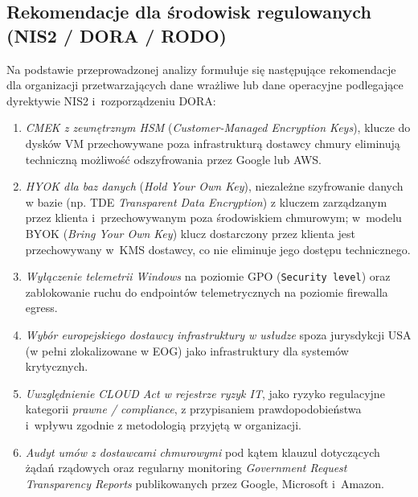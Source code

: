 \subsection{Rekomendacje dla środowisk regulowanych (NIS2 / DORA / RODO)}

Na podstawie przeprowadzonej analizy formułuje się następujące rekomendacje
dla organizacji przetwarzających dane wrażliwe lub dane operacyjne
podlegające dyrektywie NIS2 i~rozporządzeniu DORA:

\begin{enumerate}[label=(\roman*)]
  \item \textit{CMEK z zewnętrznym HSM} (\textit{Customer-Managed
  Encryption Keys}), klucze do dysków VM przechowywane poza
  infrastrukturą dostawcy chmury eliminują techniczną możliwość
  odszyfrowania przez Google lub AWS.

  \item \textit{HYOK dla baz danych} (\textit{Hold Your Own Key}), niezależne szyfrowanie danych
  w bazie (np. TDE \textit{Transparent Data Encryption}) z kluczem
  zarządzanym przez klienta i~przechowywanym poza środowiskiem chmurowym;
  w~modelu BYOK (\textit{Bring Your Own Key}) klucz dostarczony przez klienta
  jest przechowywany w~KMS dostawcy, co nie eliminuje jego dostępu technicznego.

  \item \textit{Wyłączenie telemetrii Windows} na poziomie GPO
  (\texttt{Security level}) oraz zablokowanie ruchu do endpointów
  telemetrycznych na poziomie firewalla egress.

  \item \textit{Wybór europejskiego dostawcy infrastruktury w usłudze} spoza jurysdykcji
  USA (w pełni zlokalizowane w EOG) jako infrastruktury
  dla systemów krytycznych.

  \item \textit{Uwzględnienie CLOUD Act w rejestrze ryzyk IT}, jako
  ryzyko regulacyjne kategorii \textit{prawne / compliance},
  z przypisaniem prawdopodobieństwa i~wpływu zgodnie z metodologią
  przyjętą w organizacji.

  \item \textit{Audyt umów z dostawcami chmurowymi} pod kątem klauzul
  dotyczących żądań rządowych oraz regularny monitoring
  \textit{Government Request Transparency Reports} publikowanych przez
  Google, Microsoft i~Amazon.
\end{enumerate}

